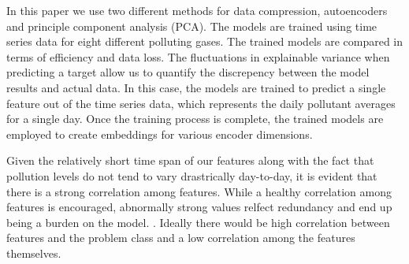 \documentclass{article}
\begin{document}
\par In this paper we use two different methods for data compression, autoencoders and principle component analysis (PCA). The models are trained using time series data for eight different polluting gases. The trained models are compared in terms of efficiency and data loss. The fluctuations in explainable variance when predicting a target allow us to quantify the discrepency between the model results and actual data. In this case, the models are trained to predict a single feature out of the time series data, which represents the daily pollutant averages for a single day. Once the training process is complete, the trained models are employed to create embeddings for various encoder dimensions. 

\par Given the relatively short time span of our features along with the fact that pollution levels do not tend to vary drastrically day-to-day, it is evident that there is a strong correlation among features. While a healthy correlation among features is encouraged, abnormally strong values
relfect redundancy and end up being a burden on the model. \parencite{featureredundancy}. Ideally there would be high correlation between features and the problem class and a low correlation among the features themselves.
\end{document}
